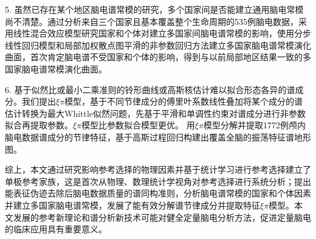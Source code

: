 \begin{chineseabstract}
5. 虽然已存在某个地区脑电谱常模的研究，多个国家间是否能建立通用脑电常模尚不清楚。通过分析来自三个国家且基本覆盖整个生命周期的535例脑电数据，采用线性混合效应模型研究国家和个体对建立多国家间脑电谱常模的影响，使用分步线性回归模型和局部加权散点图平滑的非参数回归方法建立多国家脑电谱常模演化曲面，首次肯定脑电谱不受国家和个体的影响，得到与以前局部地区结果一致的多国家脑电谱常模演化曲面。

6. 基于似然比或最小二乘准则的铃形曲线或高斯核估计难以拟合形态各异的谱成分。我们提出$\xi\pi$模型，基于不同节律成分的傅里叶系数线性叠加将某个成分的谱估计转换为最大Whittle似然问题，先基于平滑和单调性约束对谱成分进行非参数拟合再提取参数。$\xi\pi$模型比参数拟合模型更优。
用$\xi\pi$模型分解并提取1772例颅内脑电数据谱成分的节律特征，基于高斯过程回归构建出覆盖全脑的振荡特征谱地形图。

综上，本文通过研究影响参考选择的物理因素并基于统计学习进行参考选择建立了单极参考家族，这是首次从物理、数理统计学视角对参考选择进行系统分析；提出能表征伪迹去除后脑电数据质量的谱同构准则，分析脑电谱常模的国家和个体因素并建立多国家脑电谱常模，发展了能有效分解谱节律成分并提取特征$\xi\pi$模型。本文发展的参考新理论和谱分析新技术可能对健全定量脑电分析方法，促进定量脑电的临床应用具有重要意义。

\end{chineseabstract}
